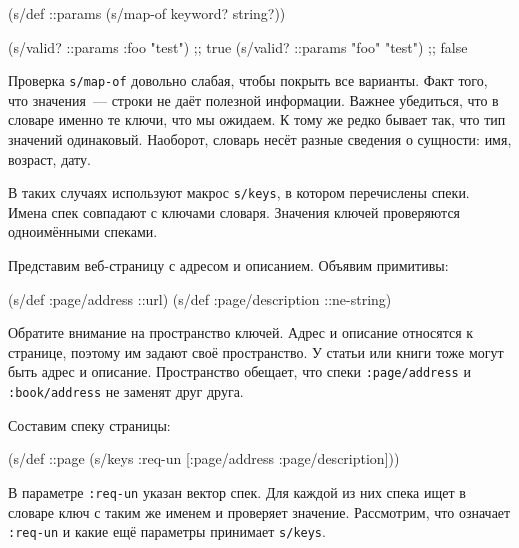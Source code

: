 \begin{english}
  \begin{clojure}
(s/def ::params
  (s/map-of keyword? string?))

(s/valid? ::params {:foo "test"})  ;; true
(s/valid? ::params {"foo" "test"}) ;; false
  \end{clojure}
\end{english}

Проверка \verb|s/map-of| довольно слабая, чтобы покрыть все варианты. Факт
того, что значения~--- строки не даёт полезной информации. Важнее убедиться, что
в словаре именно те ключи, что мы ожидаем. К тому же редко бывает так, что тип
значений одинаковый. Наоборот, словарь несёт разные сведения о сущности:
имя, возраст, дату.


В таких случаях используют макрос \verb|s/keys|, в котором перечислены
спеки. Имена спек совпадают с ключами словаря. Значения ключей проверяются
одноимёнными спеками.

Представим веб-страницу с адресом и описанием. Объявим примитивы:

\begin{english}
  \begin{clojure}
(s/def :page/address ::url)
(s/def :page/description ::ne-string)
  \end{clojure}
\end{english}


Обратите внимание на пространство ключей. Адрес и описание относятся к странице,
поэтому им задают своё пространство. У статьи или книги тоже могут быть адрес и
описание. Пространство обещает, что спеки \verb|:page/address| и
\verb|:book/address| не заменят друг друга.

Составим спеку страницы:

\begin{english}
  \begin{clojure}
(s/def ::page
  (s/keys :req-un [:page/address
                   :page/description]))
  \end{clojure}
\end{english}


В параметре \verb|:req-un| указан вектор спек. Для каждой из них спека ищет в
словаре ключ с таким же именем и проверяет значение. Рассмотрим, что означает
\verb|:req-un| и какие ещё параметры принимает \verb|s/keys|.

